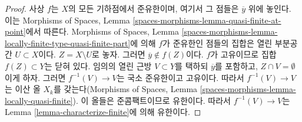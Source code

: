 \begin{proof}
사상 $f$는 $X$의 모든 기하점에서 준유한이며, 여기서 그 점들은
$\overline{y}$ 위에 놓인다. 이는 Morphisms of Spaces, Lemma
\ref{spaces-morphisms-lemma-quasi-finite-at-point}에서 따른다.
Morphisms of Spaces, Lemma
\ref{spaces-morphisms-lemma-locally-finite-type-quasi-finite-part}에 의해
$f$가 준유한인 점들의 집합은 열린 부분공간 $U \subset X$이다.
$Z = X \setminus U$로 놓자. 그러면
$\overline{y} \not \in f(Z)$이다. $f$가 고유이므로 집합
$f(Z) \subset Y$는 닫혀 있다. 임의의 열린 근방 $V \subset Y$를
택하되 $\overline{y}$를 포함하고,
$Z \cap V = \emptyset$이게 하자. 그러면
$f^{-1}(V) \to V$는 국소 준유한이고 고유이다. 따라서
$f^{-1}(V) \to V$는 이산 올 $X_k$를 갖는다(Morphisms of Spaces,
Lemma \ref{spaces-morphisms-lemma-locally-quasi-finite}). 이 올들은
준콤팩트이므로 유한이다. 따라서 $f^{-1}(V) \to V$는 Lemma
\ref{lemma-characterize-finite}에 의해 유한이다.
\end{proof}










